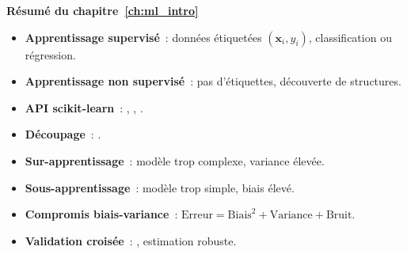 \begin{formules}
\textbf{R\'esum\'e du chapitre~\ref{ch:ml_intro}}
\begin{itemize}
    \item \textbf{Apprentissage supervis\'e}~: donn\'ees \'etiquet\'ees $(\mathbf{x}_i, y_i)$, classification ou r\'egression.
    \item \textbf{Apprentissage non supervis\'e}~: pas d'\'etiquettes, d\'ecouverte de structures.
    \item \textbf{API scikit-learn}~: , , .
    \item \textbf{D\'ecoupage}~: .
    \item \textbf{Sur-apprentissage}~: mod\`ele trop complexe, variance \'elev\'ee.
    \item \textbf{Sous-apprentissage}~: mod\`ele trop simple, biais \'elev\'e.
    \item \textbf{Compromis biais-variance}~: $\text{Erreur} = \text{Biais}^2 + \text{Variance} + \text{Bruit}$.
    \item \textbf{Validation crois\'ee}~: , estimation robuste.
\end{itemize}
\end{formules}
